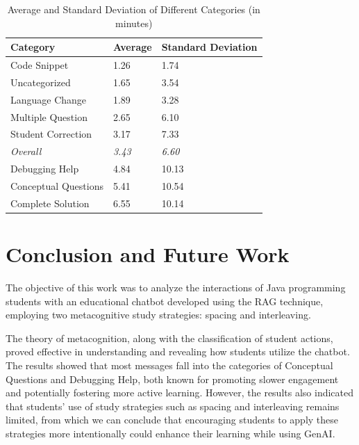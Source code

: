 \documentclass[a4paper,twoside]{article}
\begin{document}
\begin{table}[htbp]
  \caption{Average and Standard Deviation of Different Categories (in minutes)}
  \begin{center}
    \renewcommand{\arraystretch}{1.6} %
    \begin{tabular}{p{4cm} p{4cm} p{4cm}} %
      \hline
      \textbf{Category} & \textbf{Average} & \textbf{Standard Deviation} \\
      \hline
      Code Snippet & 1.26 & 1.74 \\
      Uncategorized & 1.65 & 3.54 \\
      Language Change & 1.89 & 3.28 \\
      Multiple Question & 2.65 & 6.10 \\
      Student Correction & 3.17 & 7.33 \\
      \hdashline
      \textit{Overall} & \textit{3.43} & \textit{6.60} \\
      \hdashline
      Debugging Help & 4.84 & 10.13 \\
      Conceptual Questions & 5.41 & 10.54 \\
      Complete Solution & 6.55 & 10.14 \\
      \hline
    \end{tabular}
    \label{tab:averages}
  \end{center}
\end{table}

\section{Conclusion and Future Work}

The objective of this work was to analyze the interactions of Java programming
students with an educational chatbot developed using the RAG technique, employing
two metacognitive study strategies: spacing and interleaving.

The theory of metacognition, along with the classification of student actions,
proved effective in understanding and revealing how students utilize the chatbot.
The results showed that most messages fall into the categories of Conceptual
Questions and Debugging Help, both known for promoting slower engagement and
potentially fostering more active learning. However, the results also indicated
that students' use of study strategies such as spacing and interleaving remains
limited, from which we can conclude that encouraging students to apply these
strategies more intentionally could enhance their learning while using GenAI.
\end{document}
